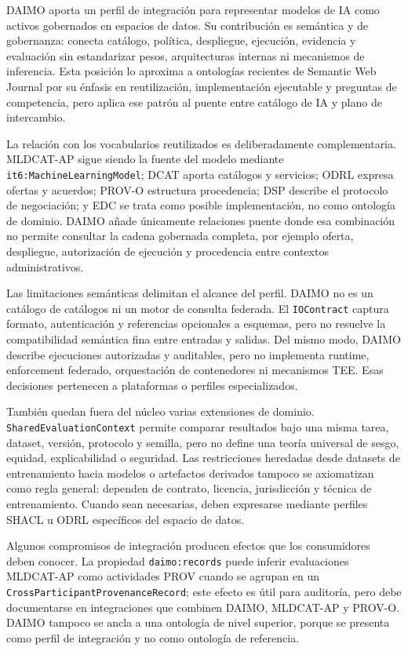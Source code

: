 \documentclass[Afour,sagev,times]{sagej}
\newcommand{\code}[1]{\texttt{#1}}
\begin{document}
DAIMO aporta un perfil de integración para representar modelos de IA como activos gobernados en espacios de datos. Su contribución es semántica y de gobernanza: conecta catálogo, política, despliegue, ejecución, evidencia y evaluación sin estandarizar pesos, arquitecturas internas ni mecanismos de inferencia. Esta posición lo aproxima a ontologías recientes de Semantic Web Journal por su énfasis en reutilización, implementación ejecutable y preguntas de competencia, pero aplica ese patrón al puente entre catálogo de IA y plano de intercambio.

La relación con los vocabularios reutilizados es deliberadamente complementaria. MLDCAT-AP sigue siendo la fuente del modelo mediante \code{it6:MachineLearningModel}; DCAT aporta catálogos y servicios; ODRL expresa ofertas y acuerdos; PROV-O estructura procedencia; DSP describe el protocolo de negociación; y EDC se trata como posible implementación, no como ontología de dominio. DAIMO añade únicamente relaciones puente donde esa combinación no permite consultar la cadena gobernada completa, por ejemplo oferta, despliegue, autorización de ejecución y procedencia entre contextos administrativos.

Las limitaciones semánticas delimitan el alcance del perfil. DAIMO no es un catálogo de catálogos ni un motor de consulta federada. El \code{IOContract} captura formato, autenticación y referencias opcionales a esquemas, pero no resuelve la compatibilidad semántica fina entre entradas y salidas. Del mismo modo, DAIMO describe ejecuciones autorizadas y auditables, pero no implementa runtime, enforcement federado, orquestación de contenedores ni mecanismos TEE. Esas decisiones pertenecen a plataformas o perfiles especializados.

También quedan fuera del núcleo varias extensiones de dominio. \code{SharedEvaluationContext} permite comparar resultados bajo una misma tarea, dataset, versión, protocolo y semilla, pero no define una teoría universal de sesgo, equidad, explicabilidad o seguridad. Las restricciones heredadas desde datasets de entrenamiento hacia modelos o artefactos derivados tampoco se axiomatizan como regla general: dependen de contrato, licencia, jurisdicción y técnica de entrenamiento. Cuando sean necesarias, deben expresarse mediante perfiles SHACL u ODRL específicos del espacio de datos.

Algunos compromisos de integración producen efectos que los consumidores deben conocer. La propiedad \code{daimo:records} puede inferir evaluaciones MLDCAT-AP como actividades PROV cuando se agrupan en un \code{CrossParticipantProvenanceRecord}; este efecto es útil para auditoría, pero debe documentarse en integraciones que combinen DAIMO, MLDCAT-AP y PROV-O. DAIMO tampoco se ancla a una ontología de nivel superior, porque se presenta como perfil de integración y no como ontología de referencia.
\end{document}
